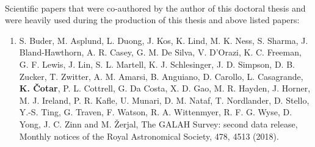 \ \\ 
\noindent
Scientific papers that were co-authored by the author of this doctoral thesis and were heavily used during the production of this thesis and above listed papers:
\begin{enumerate}
	\item{S. Buder, M. Asplund, L. Duong, J. Kos, K. Lind, M. K. Ness, S. Sharma, J. Bland-Hawthorn, A. R. Casey, G. M. De Silva, V. D’Orazi, K. C. Freeman, G. F. Lewis, J. Lin, S. L. Martell, K. J. Schlesinger, J. D. Simpson, D. B. Zucker, T. Zwitter, A. M. Amarsi, B. Anguiano, D. Carollo, L. Casagrande, \textbf{K. Čotar}, P. L. Cottrell, G. Da Costa, X. D. Gao, M. R. Hayden, J. Horner, M. J. Ireland, P. R. Kafle, U. Munari, D. M. Nataf, T. Nordlander, D. Stello, Y.-S. Ting, G. Traven, F. Watson, R. A. Wittenmyer, R. F. G. Wyse, D. Yong, J. C. Zinn and M. Žerjal, The GALAH Survey: second data release, Monthly notices of the Royal Astronomical Society, 478, 4513 (2018).}
\end{enumerate}


